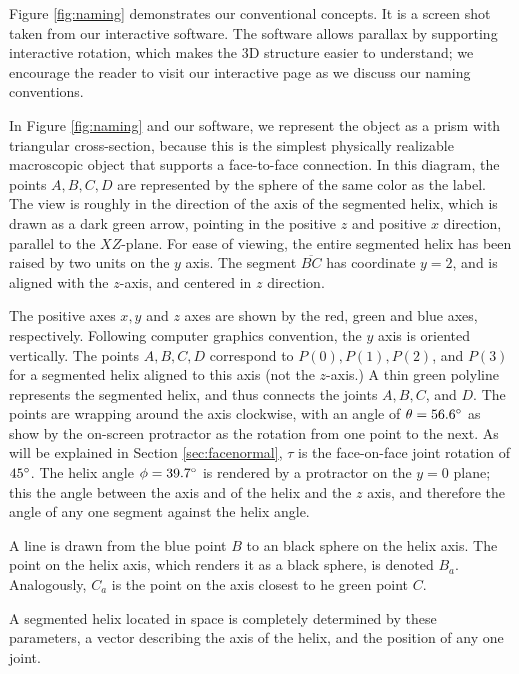 \documentclass[11pt]{article}
\begin{document}
{Figure \ref{fig:naming} demonstrates our conventional concepts. It is a screen shot taken from our interactive software\cite{segmentedhelixinteractive}. The
software allows parallax by supporting interactive rotation, which makes the 3D structure easier to understand; we encourage
the reader to visit our interactive page as we discuss our naming conventions.

In Figure \ref{fig:naming} and our software, we represent the object as a prism with triangular cross-section, because this is
the simplest physically realizable macroscopic object that supports a face-to-face connection. In this diagram, the
points $A,B,C,D$ are represented by the sphere of the same color as the label. The view is roughly in the direction of
the axis of the segmented helix, which is drawn as a dark green arrow, pointing in the positive $z$ and positive $x$ direction,
parallel to the $XZ$-plane. For ease of viewing, the entire segmented helix has been raised by two units on the $y$ axis.
The segment $\overline{BC}$ has coordinate $y = 2$, and is aligned with the $z$-axis, and centered in $z$ direction.

The positive axes $x,y$ and $z$ axes are shown by the red, green and blue axes, respectively.
Following computer graphics convention, the $y$ axis is oriented vertically.
The points $A,B,C,D$ correspond to $P(0), P(1), P(2)$, and $ P(3)$ for a segmented helix aligned
to this axis (not the $z$-axis.)
A thin green polyline represents the segmented helix, and thus connects the joints $A,B,C$, and $D$.
The points are wrapping around the axis clockwise, with an angle of $\theta = 56.6 \degree$ as
show by the on-screen protractor as the rotation from one point to the next. As will be explained in Section \ref{sec:facenormal},
$\tau$ is the face-on-face joint rotation of $45 \degree$.
The helix angle $\phi = 39.7 \degree$ is rendered by a protractor on the $y = 0$ plane; this the angle between the axis
and of the helix and the $z$ axis, and therefore the angle of any one segment against the helix angle.

A line is drawn from the blue point $B$ to an black sphere on the helix axis. The point on the helix axis, which renders it as a
black sphere, is denoted $B_a$. Analogously, $C_a$ is the point
on the axis closest to he green point $C$.


A segmented helix located in space is completely determined by these parameters, a vector describing the axis
of the helix, and the position of any one joint.

}
\end{document}
